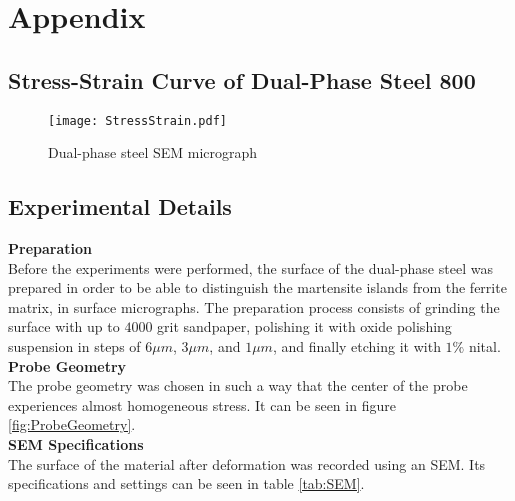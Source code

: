 
\chapter{Appendix} %

\label{Appendix} %

\section{Stress-Strain Curve of Dual-Phase Steel 800}

\begin{figure}[H]
\centering
  \texttt{[image: StressStrain.pdf]}
  \caption{Dual-phase steel SEM micrograph}
  \label{fig:DPStressStrain}
\end{figure}

\section{Experimental Details}

\textbf{Preparation} \\
Before the experiments were performed, the surface of the dual-phase steel was prepared in order to be able to distinguish the martensite islands from the ferrite matrix, in surface micrographs. The preparation process consists of grinding the surface with up to $4000$ grit sandpaper, polishing it with oxide polishing suspension in steps of $6\mu m$, $3\mu m$, and $1\mu m$, and finally etching it with $1 \%$ nital. \\

\noindent \textbf{Probe Geometry} \\
The probe geometry was chosen in such a way that the center of the probe experiences almost homogeneous stress. It can be seen in figure \ref{fig:ProbeGeometry}. \\

\noindent \textbf{SEM Specifications} \\
The surface of the material after deformation was recorded using an SEM. Its specifications and settings can be seen in table \ref{tab:SEM}. \\

